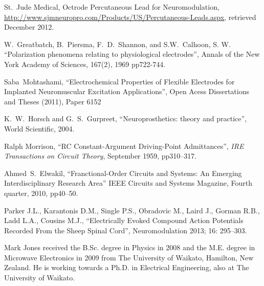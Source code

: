 \documentclass[journal, a4paper]{IEEEtran}
\begin{document}
\begin{thebibliography}{99}
    St.~Jude Medical, Octrode Percutaneous Lead for Neuromodulation,
    \url{http://www.sjmneuropro.com/Products/US/Percutaneous-Leads.aspx},
    retrieved December 2012.

    W.~Greatbatch, B.~Piersma, F.~D.~Shannon, and S.W.~Calhoon, S. W.
    ``Polarization phenomena relating to physiological electrodes'',
    Annals of the New York Academy of Sciences,
    167(2), 1969 pp722-744.


    Saba~Mohtashami,
    ``Electrochemical Properties of Flexible Electrodes for Implanted Neuromuscular Excitation Applications'',
    Open Acess Dissertations and Theses (2011), Paper 6152

    K.~W.~Horsch and G.~S.~Gurpreet,
    ``Neuroprosthetics: theory and practice'',
    World Scientific, 2004.

    Ralph Morrison,
    ``RC Constant-Argument Driving-Point Admittances'',
    {\em IRE Transactions on Circuit Theory},
    September 1959, pp310--317.

    Ahmed~S.~Elwakil,
    ``Franctional-Order Circuits and Systems: An Emerging Interdisciplinary Research Area''
    IEEE Circuits and Systems Magazine, Fourth quarter, 2010, pp40--50.

    Parker J.L., Karantonis D.M., Single P.S., Obradovic M., Laird J., Gorman R.B., Ladd L.A., Cousins M.J.,
    ``Electrically Evoked Compound Action Potentials Recorded From the Sheep Spinal Cord'',
    Neuromodulation 2013; 16: 295--303.


\end{thebibliography}

\begin{IEEEbiography}{Mark Jones}
received the B.Sc. degree in Physics in 2008 and the M.E. degree in Microwave Electronics in 2009 from The University of Waikato, Hamilton, New Zealand.
He is working towards a Ph.D. in Electrical Engineering, also at The University of Waikato.
\end{IEEEbiography}
\end{document}
